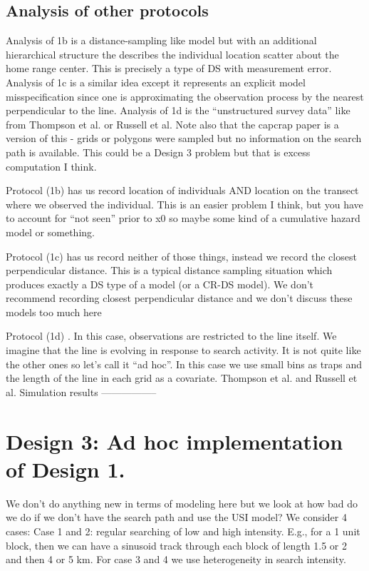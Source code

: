\subsection{Analysis of other protocols}

Analysis of 1b is a distance-sampling like model but with an additional hierarchical structure the describes the individual location scatter about the home range center. This is precisely a type of DS with measurement error. Analysis of 1c is a similar idea except it represents an explicit model misspecification since one is approximating the observation process by the nearest perpendicular to the line.  Analysis of 1d is the ``unstructured survey data'' like from Thompson et al. or Russell et al.  Note also that the capcrap paper is a version of this - grids or polygons were sampled but no information on the search path is available. This could be a Design 3 problem but that is excess computation I think. 

Protocol (1b) has us record location of individuals AND location on the transect where we observed the individual. This is an easier problem I think, but you have to account for ``not seen'' prior  to x0 so maybe some kind of a cumulative hazard model or something. 

Protocol (1c) has us record neither of those things, instead we record the closest perpendicular distance. This is a typical distance sampling situation which produces exactly a DS type of a model (or a CR-DS model). We don't recommend recording closest perpendicular distance and we don't discuss these models too much here

Protocol (1d) . In this case, observations are restricted to the line itself. We imagine that the line is evolving in response to search activity. It is not quite like the other ones so let's call it ``ad hoc''. In this case we use small bins as traps and the length of the line in each grid as a covariate. Thompson et al. and Russell et al.
Simulation results -----------------



\section{ Design 3: Ad hoc implementation of Design 1. }

We don't do anything new in terms of modeling here but we look at how
bad do we do if we don't have the search path and use the USI model?
We consider 4 cases: Case 1 and 2: regular searching of low and high
intensity. E.g., for a 1 unit block, then we can have a sinusoid track
through each block of length 1.5 or 2 and then 4 or 5 km.  For case 3
and 4 we use heterogeneity in search intensity.


